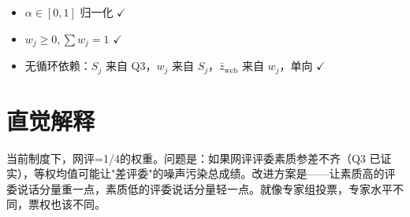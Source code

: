 \documentclass[UTF8]{ctexart}
\begin{document}
\begin{itemize}
\item $\alpha \in [0,1]$ 归一化 $\checkmark$
\item $w_j \geq 0, \sum w_j = 1$ $\checkmark$
\item 无循环依赖：$S_j$ 来自 Q3，$w_j$ 来自 $S_j$，$\bar{z}_{\text{web}}$ 来自 $w_j$，单向 $\checkmark$
\end{itemize}

\section{直觉解释}

当前制度下，网评=1/4的权重。问题是：如果网评评委素质参差不齐（Q3 已证实），等权均值可能让"差评委"的噪声污染总成绩。改进方案是——让素质高的评委说话分量重一点，素质低的评委说话分量轻一点。就像专家组投票，专家水平不同，票权也该不同。
\end{document}
